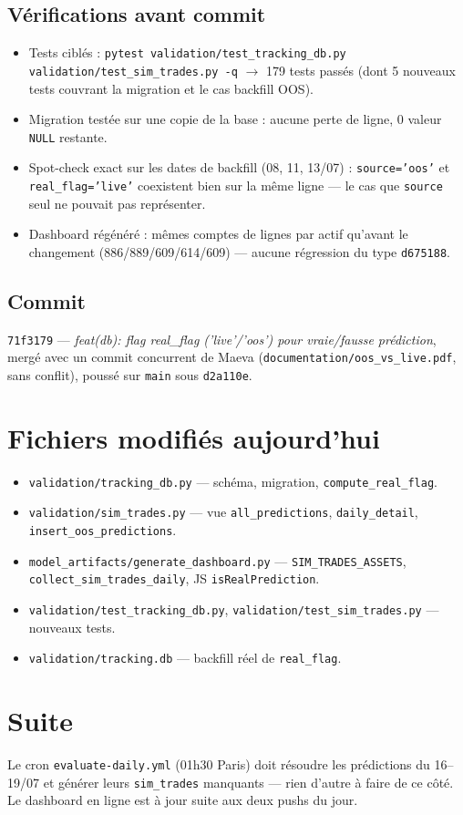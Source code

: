 \documentclass[11pt]{article}
\begin{document}
\subsection{Vérifications avant commit}
\begin{itemize}
  \item Tests ciblés : \texttt{pytest validation/test\_tracking\_db.py
        validation/test\_sim\_trades.py -q} $\rightarrow$ 179 tests passés
        (dont 5 nouveaux tests couvrant la migration et le cas backfill OOS).
  \item Migration testée sur une copie de la base : aucune perte de ligne,
        0 valeur \texttt{NULL} restante.
  \item Spot-check exact sur les dates de backfill (08, 11, 13/07) :
        \texttt{source='oos'} et \texttt{real\_flag='live'} coexistent bien sur
        la même ligne --- le cas que \texttt{source} seul ne pouvait pas
        représenter.
  \item Dashboard régénéré : mêmes comptes de lignes par actif qu'avant le
        changement (886/889/609/614/609) --- aucune régression du type
        \texttt{d675188}.
\end{itemize}

\subsection{Commit}
\texttt{71f3179} --- \emph{feat(db): flag real\_flag ('live'/'oos') pour
vraie/fausse prédiction}, mergé avec un commit concurrent de Maeva
(\texttt{documentation/oos\_vs\_live.pdf}, sans conflit), poussé sur
\texttt{main} sous \texttt{d2a110e}.

\section{Fichiers modifiés aujourd'hui}
\begin{itemize}
  \item \texttt{validation/tracking\_db.py} --- schéma, migration, \texttt{compute\_real\_flag}.
  \item \texttt{validation/sim\_trades.py} --- vue \texttt{all\_predictions}, \texttt{daily\_detail}, \texttt{insert\_oos\_predictions}.
  \item \texttt{model\_artifacts/generate\_dashboard.py} --- \texttt{SIM\_TRADES\_ASSETS}, \texttt{collect\_sim\_trades\_daily}, JS \texttt{isRealPrediction}.
  \item \texttt{validation/test\_tracking\_db.py}, \texttt{validation/test\_sim\_trades.py} --- nouveaux tests.
  \item \texttt{validation/tracking.db} --- backfill réel de \texttt{real\_flag}.
\end{itemize}

\section{Suite}
Le cron \texttt{evaluate-daily.yml} (01h30 Paris) doit résoudre les
prédictions du 16--19/07 et générer leurs \texttt{sim\_trades} manquants ---
rien d'autre à faire de ce côté. Le dashboard en ligne est à jour suite aux
deux pushs du jour.
\end{document}
